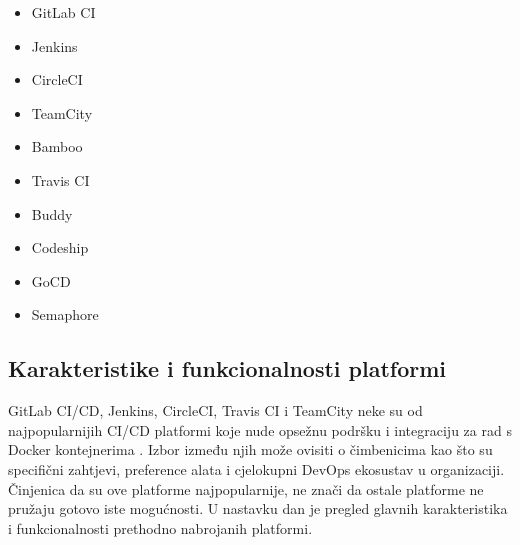 \documentclass[a4paper,12pt,oneside]{article}
\begin{document}
\begin{multicols}{2}
\begin{itemize}
\item GitLab CI
\item Jenkins
\item CircleCI
\item TeamCity
\item Bamboo
\item Travis CI
\item Buddy
\item Codeship
\item GoCD
\item Semaphore
\end{itemize}
\end{multicols}



\subsection{Karakteristike i funkcionalnosti platformi}
GitLab CI/CD, Jenkins, CircleCI, Travis CI i TeamCity neke su od najpopularnijih CI/CD platformi koje nude opsežnu podršku i integraciju za rad s Docker kontejnerima \cite{katalon_ci_tools, atlassian_ci_tools, top_7_ci_tools}. Izbor između njih može ovisiti o čimbenicima kao što su specifični zahtjevi, preference alata i cjelokupni DevOps ekosustav u organizaciji. Činjenica da su ove platforme najpopularnije, ne znači da ostale platforme ne pružaju gotovo iste mogućnosti. U nastavku dan je pregled glavnih karakteristika i funkcionalnosti prethodno nabrojanih platformi.
\end{document}

